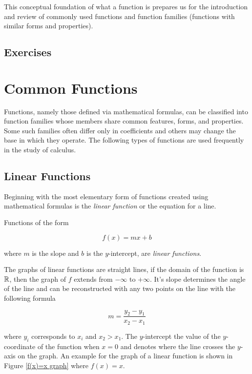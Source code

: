 This conceptual foundation of what a  function is prepares us for the introduction and review of commonly used functions and function families (functions with similar forms and properties).

\subsection{Exercises}

\section{Common Functions}
Functions, namely those defined via mathematical formulas, can be classified into function families whose members share common features, forms, and properties. Some such families often differ only in coefficients and others may change the base in which they operate. The following types of functions are used frequently in the study of calculus.

\subsection{Linear Functions}
Beginning with the most elementary form of functions created using mathematical formulas is the \textit{linear function} or the equation for a line.

\begin{definition}
    Functions of the form

    \begin{equation}
        f(x) = mx + b
    \end{equation}

    \noindent where $m$ is the slope and $b$ is the $y$-intercept, are \textit{linear functions}.
\end{definition}

The graphs of linear functions are straight lines, if the domain of the function is $\mathbb{R}$, then the graph of $f$ extends from $-\infty$ to $+\infty$. It's slope determines the angle of the line and can be reconstructed with any two points on the line with the following formula

\begin{equation}
    m = \frac{y_2-y_1}{x_2-x_1}
    \label{slopeofaline}
\end{equation}

\noindent where $y_i$ corresponds to $x_i$ and $x_2 > x_1$. The $y$-intercept the value of the $y$-coordinate of the function when $x=0$ and denotes where the line crosses the $y$-axis on the graph. An example for the graph of a linear function is shown in Figure \ref{f(x)=x graph} where $f(x) = x$.

